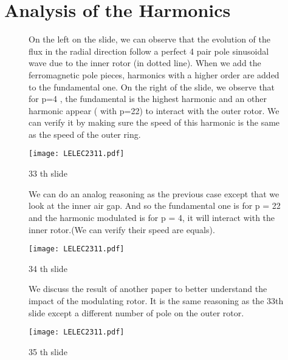 \section{Analysis of the Harmonics}
\begin{figure}[H]
    \begin{minipage}{.45\linewidth}
    On the left on the slide, we can observe that the evolution of the flux in the radial direction follow a perfect 4 pair pole sinusoidal wave due to the inner rotor (in dotted line). When we add the ferromagnetic pole pieces, harmonics with a higher order are added to the fundamental one.
    On the right of the slide, we observe that for p=4 , the fundamental is the highest harmonic and an other harmonic appear ( with p=22) to interact with the outer rotor. We can verify it by making sure the speed of this harmonic is the same as the speed of the outer ring.
       
    \end{minipage}
    \hfill%
    \begin{minipage}[c]{.45\linewidth}
        \centering
        \texttt{[image: LELEC2311.pdf]}
        \caption{33 th slide}
        \label{fig:33_th slide}
    \end{minipage}
\end{figure}

\begin{figure}[H]
    \begin{minipage}{.45\linewidth}
    We can do an analog reasoning as the previous case except that we look at the inner air gap. And so the fundamental one is for p = 22 and the harmonic modulated is for p = 4, it will interact with the inner rotor.(We can verify their speed are equals).
       
    \end{minipage}
    \hfill%
    \begin{minipage}[c]{.45\linewidth}
        \centering
        \texttt{[image: LELEC2311.pdf]}
        \caption{34 th slide}
    \end{minipage}
\end{figure}

\begin{figure}[H]
    \begin{minipage}{.45\linewidth}
    We discuss the result of another paper to better understand the impact of the modulating rotor. It is the same reasoning as the 33th slide except a different number of pole on the outer rotor.
       
    \end{minipage}
    \hfill%
    \begin{minipage}[c]{.45\linewidth}
        \centering
        \texttt{[image: LELEC2311.pdf]}
        \caption{35 th slide}
    \end{minipage}
\end{figure}

